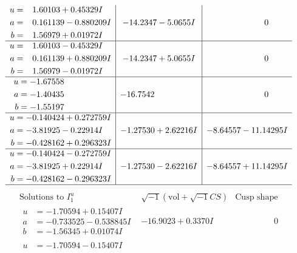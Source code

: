 \documentclass[1p]{elsarticle_modified}
\theoremstyle{definition}
\newcommand{\I}{\sqrt{-1}}
\begin{document}
$$\begin{array}{c|c|c}
\begin{aligned}
u &= \phantom{-}1.60103 + 0.45329 I \\
a &= \phantom{-}0.161139 - 0.880209 I \\
b &= \phantom{-}1.56979 + 0.01972 I\end{aligned}
 & -14.2347 - 5.0655 I & \phantom{-0.000000 } 0 \\ \hline\begin{aligned}
u &= \phantom{-}1.60103 - 0.45329 I \\
a &= \phantom{-}0.161139 + 0.880209 I \\
b &= \phantom{-}1.56979 - 0.01972 I\end{aligned}
 & -14.2347 + 5.0655 I & \phantom{-0.000000 } 0 \\ \hline\begin{aligned}
u &= -1.67558\phantom{ +0.000000I} \\
a &= -1.40435\phantom{ +0.000000I} \\
b &= -1.55197\phantom{ +0.000000I}\end{aligned}
 & -16.7542\phantom{ +0.000000I} & \phantom{-0.000000 } 0 \\ \hline\begin{aligned}
u &= -0.140424 + 0.272759 I \\
a &= -3.81925 - 0.22914 I \\
b &= -0.428162 + 0.296323 I\end{aligned}
 & -1.27530 + 2.62216 I & -8.64557 - 11.14295 I \\ \hline\begin{aligned}
u &= -0.140424 - 0.272759 I \\
a &= -3.81925 + 0.22914 I \\
b &= -0.428162 - 0.296323 I\end{aligned}
 & -1.27530 - 2.62216 I & -8.64557 + 11.14295 I\\
 \hline 
 \end{array}$$\newpage$$\begin{array}{c|c|c}  
\text{Solutions to }I^u_{1}& \I (\text{vol} + \sqrt{-1}CS) & \text{Cusp shape}\\
 \hline 
\begin{aligned}
u &= -1.70594 + 0.15407 I \\
a &= -0.733525 - 0.538845 I \\
b &= -1.56345 + 0.01074 I\end{aligned}
 & -16.9023 + 0.3370 I & \phantom{-0.000000 } 0 \\ \hline\begin{aligned}
u &= -1.70594 - 0.15407 I \\

\end{aligned}
\end{array}$$
\end{document}
